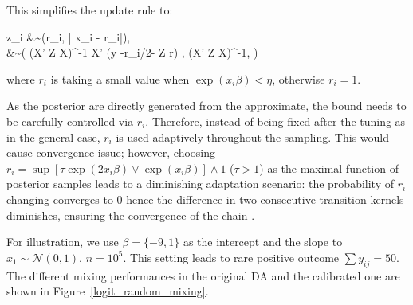 \documentclass[10pt]{article}
\newcommand{\xbeta}{ x_i \beta}
\newcommand{\be}{\begin{equs}}
\newcommand{\ee}{\end{equs}}
\DeclareMathOperator{\No}{No}
\DeclareMathOperator{\PG}{PG}
\begin{document}
This simplifies the update rule to:

\be
 z_i &\sim {\PG}(r_i, |\xbeta - \log r_i|),\\
\beta &\sim \No \left(  (X' Z X)^{-1}  X'  (y -r_i/2- Z \log r) ,  (X' Z X)^{-1}, \right)
\ee
where $r_i$ is taking a small value when $\exp(\xbeta) < \eta$, otherwise $r_i=1$. 

As the posterior are directly generated from the approximate, the bound needs to be carefully controlled via $r_i$. Therefore, instead of  being fixed after the tuning as in the general case, $r_i$ is used adaptively throughout the sampling. This would cause convergence issue; however, choosing $r_{i} = \sup[\tau{\exp(2\xbeta)}  \vee {\exp(\xbeta)} ]  \wedge 1$ ($\tau>1$) as the maximal function of posterior samples leads to a diminishing adaptation scenario: the probability of $r_i$ changing converges to $0$ hence the difference in two consecutive transition kernels diminishes,  ensuring the convergence of the chain \citep{roberts2007coupling}.

For illustration, we use $\beta=\{-9,1\}$ as the intercept and the slope to $x_1\sim \mathcal{N}(0,1)$, $n= 10^5$. This setting leads to rare positive outcome $\sum y_{ij} = 50 $. The different mixing performances in the original DA and the calibrated one are shown in Figure~\ref{logit_random_mixing}.
\end{document}

